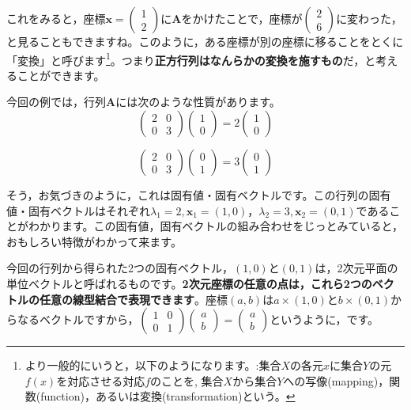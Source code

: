 \documentclass{ltjsbook}
\begin{document}
これをみると，座標$\bm{x}=\begin{pmatrix}1\\2\end{pmatrix}$に$\bm{A}$をかけたことで，座標が$\begin{pmatrix}2\\6\end{pmatrix}$に変わった，と見ることもできますね。このように，ある座標が別の座標に移ることをとくに「変換」と呼びます\footnote{より一般的にいうと，以下のようになります。:集合$X$の各元$x$に集合$Y$の元$f(x)$を対応させる対応$f$のことを, 集合$X$から集合$Y$への写像(mapping)，関数(function)，あるいは変換(transformation)という。}。つまり\textbf{正方行列はなんらかの変換を施すもの}だ，と考えることができます。

今回の例では，行列$\bm{A}$には次のような性質があります。
\begin{equation}
    \begin{pmatrix}
        2 & 0 \\
        0 & 3
    \end{pmatrix}
    \begin{pmatrix}
        1 \\
        0
    \end{pmatrix}
    = 2 \begin{pmatrix} 1 \\ 0 \end{pmatrix}
\end{equation}

\begin{equation}
    \begin{pmatrix} 2 & 0\\ 0 & 3 \end{pmatrix} \begin{pmatrix} 0 \\ 1 \end{pmatrix}
    = 3 \begin{pmatrix} 0 \\ 1 \end{pmatrix}
\end{equation}

そう，お気づきのように，これは固有値・固有ベクトルです。この行列の固有値・固有ベクトルはそれぞれ$\lambda_1=2,\bm{x}_1=(1,0)$，$\lambda_2=3,\bm{x}_2=(0,1)$であることがわかります。この固有値，固有ベクトルの組み合わせをじっとみていると，おもしろい特徴がわかって来ます。

今回の行列から得られた2つの固有ベクトル，$(1,0)$と$(0,1)$は，2次元平面の単位ベクトルと呼ばれるものです。\textbf{2次元座標の任意の点は，これら2つのベクトルの任意の線型結合で表現できます}。座標$(a,b)$は$a\times(1,0)$と$b\times(0,1)$からなるベクトルですから，$\begin{pmatrix}1 & 0\\0 & 1\end{pmatrix}\begin{pmatrix}a\\b\end{pmatrix}=\begin{pmatrix}a\\b\end{pmatrix}$というように，です。
\end{document}
